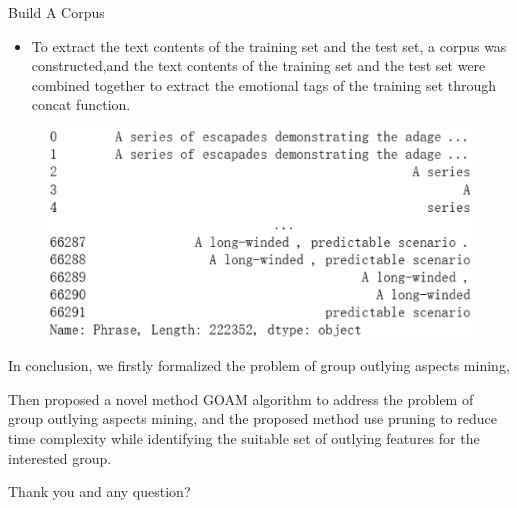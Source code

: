 \documentclass[
 size=14pt,
 paper=smartboard,  %
 mode=present, 		%
 display=slides, 	%
 style=tuliplab,  	%
 pauseslide,
 fleqn,leqno]{powerdot}
\begin{document}
\begin{slide}[toc=,bm=]{Build A Corpus}
\begin{itemize}
\item 
To extract the text contents of the training set and the test set, 
a corpus was constructed,and the text contents of the training set 
and the test set were combined together to extract the emotional tags 
of the training set through concat function.
\end{itemize}
\begin{figure}[htbp]
  \centering
  \begin{minipage}[t]{0.48\textwidth}
    \centering
    \centerline{\includegraphics[width=1.5\textwidth]{logos/hebing.eps}}
    \vspace{0.4em}
  \end{minipage}
\end{figure}




\begin{note}
In conclusion,
we firstly formalized the problem of
group outlying aspects mining,

Then proposed a novel method GOAM algorithm to address the problem of
group outlying aspects mining,
and the proposed method use pruning to reduce time complexity
while identifying the suitable set of outlying features for the interested group.

Thank you and any question?
\end{note}

\end{slide}
\end{document}
